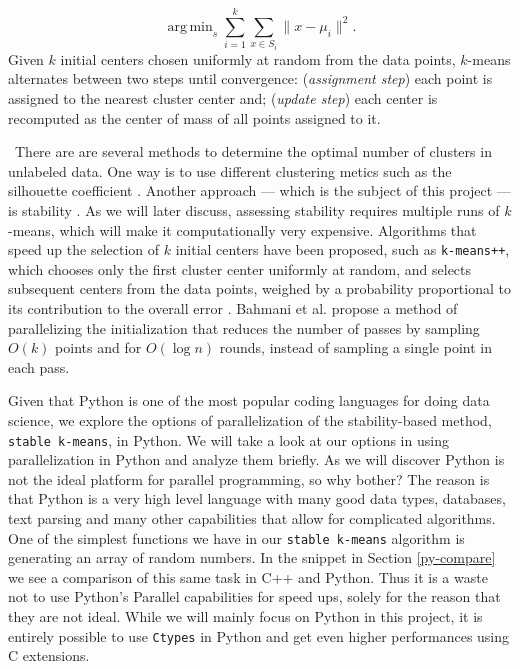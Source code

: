 \documentclass[10pt,twocolumn,letterpaper]{article}
\DeclareMathOperator*{\argmin}{arg\,min}
\begin{document}
\[
\argmin_s \sum_{i=1}^{k}\sum_{x \in S_i}\parallel x - \mu_i \parallel^2.
\] Given $k$ initial centers chosen uniformly at random from the data points, $k$-means alternates between two steps until convergence: (\textit{assignment step}) each point is assigned to the nearest cluster center and; (\textit{update step}) each center is recomputed as the center of mass of all points assigned to it.

\
There are are several methods to determine the optimal number of clusters in unlabeled data. One way is to use different clustering metics such as the silhouette coefficient \cite{aranganayagi2007}. Another approach --- which is the subject of this project --- is stability \cite{ben2001}\cite{smith1980}. As we will later discuss, assessing stability requires multiple runs of $k$-means, which will make it computationally very expensive. Algorithms that speed up the selection of $k$ initial centers have been proposed, such as {\texttt{k-means++}}, which chooses only the first cluster center uniformly at random, and selects subsequent centers from the data points, weighed by a probability proportional to its contribution to the overall error \cite{arthur2007}. Bahmani et al. \cite{bahmani2012} propose a method of parallelizing the initialization that reduces the number of passes by sampling $O(k)$ points and for $O (\log n)$ rounds, instead of sampling a single point in each pass.%

Given that Python is one of the most popular coding languages for doing data science, we explore the options of parallelization of the stability-based method, \texttt{stable k-means}, in Python. We will take a look at our options in using parallelization in Python and analyze them briefly. As we will discover Python is not the ideal platform for parallel programming, so why bother? The reason is that Python is a very high level language with many good data types, databases, text parsing and many other capabilities that allow for complicated algorithms. One of the simplest functions we have in our \texttt{stable k-means} algorithm is generating an array of random numbers. In the snippet in Section \ref{py-compare} we see a comparison of this same task in C++ and Python. Thus it is a waste not to use Python's Parallel capabilities for speed ups, solely for the reason that they are not ideal. While we will mainly focus on Python in this project, it is entirely possible to use \texttt{Ctypes} in Python and get even higher performances using C extensions.
\end{document}
